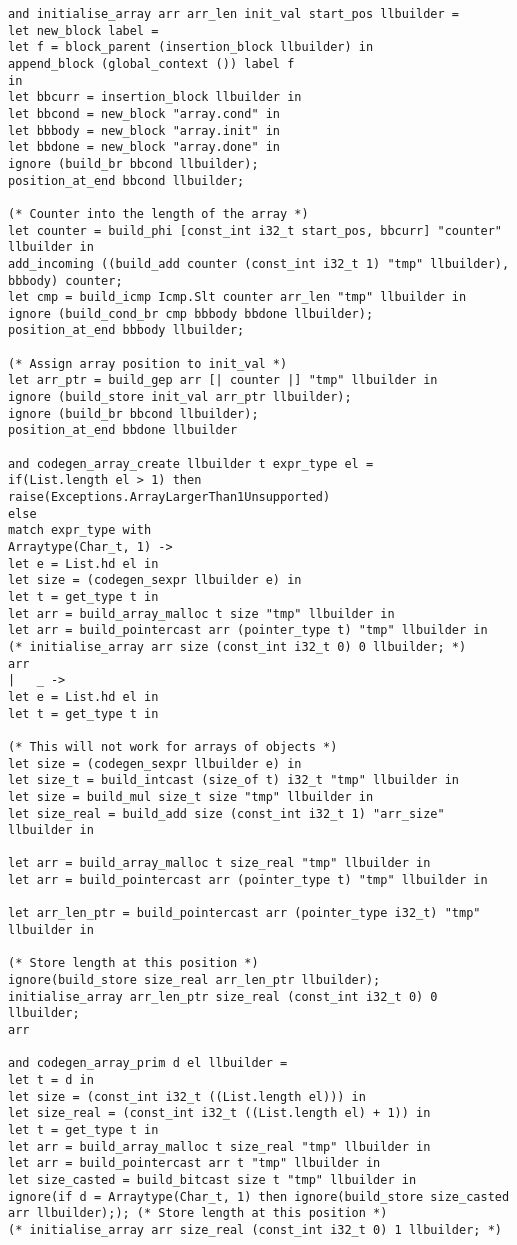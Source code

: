 \begin{verbatim}
and initialise_array arr arr_len init_val start_pos llbuilder =
let new_block label =
let f = block_parent (insertion_block llbuilder) in
append_block (global_context ()) label f
in
let bbcurr = insertion_block llbuilder in
let bbcond = new_block "array.cond" in
let bbbody = new_block "array.init" in
let bbdone = new_block "array.done" in
ignore (build_br bbcond llbuilder);
position_at_end bbcond llbuilder;

(* Counter into the length of the array *)
let counter = build_phi [const_int i32_t start_pos, bbcurr] "counter" llbuilder in
add_incoming ((build_add counter (const_int i32_t 1) "tmp" llbuilder), bbbody) counter;
let cmp = build_icmp Icmp.Slt counter arr_len "tmp" llbuilder in
ignore (build_cond_br cmp bbbody bbdone llbuilder);
position_at_end bbbody llbuilder;

(* Assign array position to init_val *)
let arr_ptr = build_gep arr [| counter |] "tmp" llbuilder in
ignore (build_store init_val arr_ptr llbuilder);
ignore (build_br bbcond llbuilder);
position_at_end bbdone llbuilder

and codegen_array_create llbuilder t expr_type el = 
if(List.length el > 1) then raise(Exceptions.ArrayLargerThan1Unsupported)
else
match expr_type with 
Arraytype(Char_t, 1) -> 
let e = List.hd el in
let size = (codegen_sexpr llbuilder e) in
let t = get_type t in
let arr = build_array_malloc t size "tmp" llbuilder in
let arr = build_pointercast arr (pointer_type t) "tmp" llbuilder in
(* initialise_array arr size (const_int i32_t 0) 0 llbuilder; *)
arr
| 	_ -> 
let e = List.hd el in
let t = get_type t in

(* This will not work for arrays of objects *)
let size = (codegen_sexpr llbuilder e) in
let size_t = build_intcast (size_of t) i32_t "tmp" llbuilder in
let size = build_mul size_t size "tmp" llbuilder in
let size_real = build_add size (const_int i32_t 1) "arr_size" llbuilder in

let arr = build_array_malloc t size_real "tmp" llbuilder in
let arr = build_pointercast arr (pointer_type t) "tmp" llbuilder in

let arr_len_ptr = build_pointercast arr (pointer_type i32_t) "tmp" llbuilder in

(* Store length at this position *)
ignore(build_store size_real arr_len_ptr llbuilder); 
initialise_array arr_len_ptr size_real (const_int i32_t 0) 0 llbuilder;
arr

and codegen_array_prim d el llbuilder =
let t = d in
let size = (const_int i32_t ((List.length el))) in
let size_real = (const_int i32_t ((List.length el) + 1)) in
let t = get_type t in
let arr = build_array_malloc t size_real "tmp" llbuilder in
let arr = build_pointercast arr t "tmp" llbuilder in
let size_casted = build_bitcast size t "tmp" llbuilder in
ignore(if d = Arraytype(Char_t, 1) then ignore(build_store size_casted arr llbuilder);); (* Store length at this position *)
(* initialise_array arr size_real (const_int i32_t 0) 1 llbuilder; *)


\end{verbatim}
